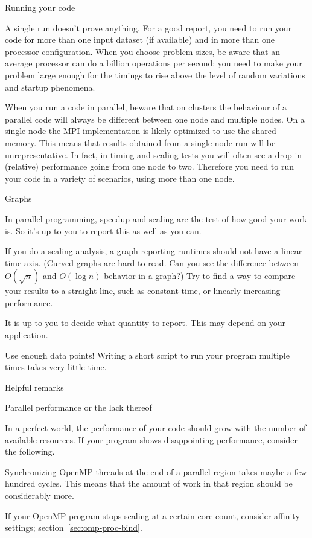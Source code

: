  {Running your code}

A single run doesn't prove anything. For a good report, you need to
run your code for more than one input dataset (if available) and in
more than one processor configuration. When you choose problem sizes,
be aware that an average processor can do a billion operations per
second: you need to make your problem large enough for the timings to
rise above the level of random variations and startup phenomena.

When you run a code in parallel, beware that on clusters the behaviour
of a parallel code will always be different between one node and
multiple nodes.  On a single node the MPI implementation is likely
optimized to use the shared memory. This means that results obtained
from a single node run will be unrepresentative. In fact, in timing
and scaling tests you will often see a drop in (relative) performance
going from one node to two.  Therefore you need to run your code in a
variety of scenarios, using more than one node.

 {Graphs}

In parallel programming, speedup and scaling are the test of
how good your work is.
So it's up to you to report this as well as you can.

If you do a scaling analysis, a graph reporting runtimes should not
have a linear time axis.
(Curved graphs are hard to read. Can you see the difference between
$O(\sqrt n)$ and $O(\log n)$ behavior in a graph?)
Try to find a way
to compare your results to a straight line, such as constant time, or
linearly increasing performance.

It is up to you to decide what quantity to report.
This may depend on your application.

Use enough data points! Writing a short script to run
your program multiple times takes very little time.

 {Helpful remarks}

 {Parallel performance or the lack thereof}

In a perfect world, the performance of your code should grow
with the number of available resources.
If your program shows disappointing performance,
consider the following.

Synchronizing OpenMP threads at the end of a parallel region takes
maybe a few hundred cycles. This means that the amount of work
in that region should be considerably more.

If your OpenMP program stops scaling at a certain core count,
consider affinity settings; section~\ref{sec:omp-proc-bind}.

